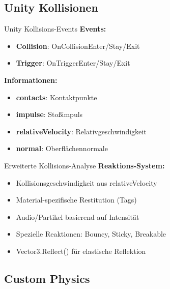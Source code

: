 \subsection{Unity Kollisionen}

\begin{definition}{Unity Kollisions-Events}
    \textbf{Events:}
    \begin{itemize}
        \item \textbf{Collision}: OnCollisionEnter/Stay/Exit
        \item \textbf{Trigger}: OnTriggerEnter/Stay/Exit
    \end{itemize}
    
    \textbf{Informationen:}
    \begin{itemize}
        \item \textbf{contacts}: Kontaktpunkte
        \item \textbf{impulse}: Stoßimpuls
        \item \textbf{relativeVelocity}: Relativgeschwindigkeit
        \item \textbf{normal}: Oberflächennormale
    \end{itemize}
\end{definition}

\begin{concept}{Erweiterte Kollisions-Analyse}
    \textbf{Reaktions-System:}
    \begin{itemize}
        \item Kollisionsgeschwindigkeit aus relativeVelocity
        \item Material-spezifische Restitution (Tags)
        \item Audio/Partikel basierend auf Intensität
        \item Spezielle Reaktionen: Bouncy, Sticky, Breakable
        \item Vector3.Reflect() für elastische Reflektion
    \end{itemize}
\end{concept}

\subsection{Custom Physics}

